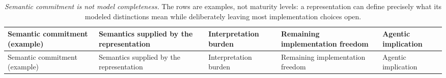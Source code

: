 {\footnotesize
\begin{longtable}[]{@{}
  >{\raggedright\arraybackslash}p{}
  >{\raggedright\arraybackslash}p{}
  >{\raggedright\arraybackslash}p{}
  >{\raggedright\arraybackslash}p{}
  >{\raggedright\arraybackslash}p{}@{}}
\caption[Degrees of semantic commitment, in concrete artifacts]{\emph{Semantic commitment is not model completeness.} The rows are examples, not maturity levels: a representation can define precisely what its modeled distinctions mean while deliberately leaving most implementation choices open.}\label{semantic-commitment-spectrum}\tabularnewline
\toprule\noalign{}
\begin{minipage}[b]{\linewidth}\raggedright
Semantic commitment (example)
\end{minipage} & \begin{minipage}[b]{\linewidth}\raggedright
Semantics supplied by the representation
\end{minipage} & \begin{minipage}[b]{\linewidth}\raggedright
Interpretation burden
\end{minipage} & \begin{minipage}[b]{\linewidth}\raggedright
Remaining implementation freedom
\end{minipage} & \begin{minipage}[b]{\linewidth}\raggedright
Agentic implication
\end{minipage} \\
\midrule\noalign{}
\endfirsthead
\toprule\noalign{}
\begin{minipage}[b]{\linewidth}\raggedright
Semantic commitment (example)
\end{minipage} & \begin{minipage}[b]{\linewidth}\raggedright
Semantics supplied by the representation
\end{minipage} & \begin{minipage}[b]{\linewidth}\raggedright
Interpretation burden
\end{minipage} & \begin{minipage}[b]{\linewidth}\raggedright
Remaining implementation freedom
\end{minipage} & \begin{minipage}[b]{\linewidth}\raggedright
Agentic implication
\end{minipage} \\

\end{longtable}}
